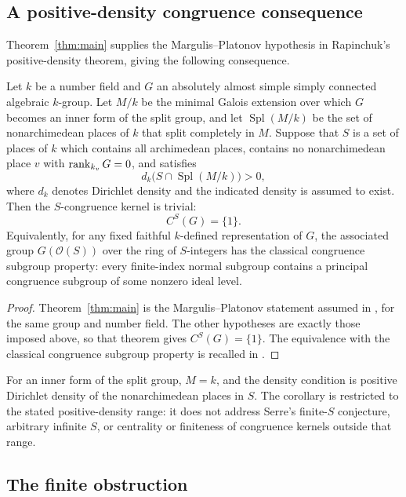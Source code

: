 \subsection{A positive-density congruence consequence}

Theorem~\ref{thm:main} supplies the Margulis--Platonov hypothesis in
Rapinchuk's positive-density theorem, giving the following consequence.

\begin{corollary}
\label{cor:positive-density-csp}
Let $k$ be a number field and $G$ an absolutely almost simple simply
connected algebraic $k$-group. Let $M/k$ be the minimal Galois extension
over which $G$ becomes an inner form of the split group, and let
$\operatorname{Spl}(M/k)$ be the set of nonarchimedean places of $k$ that
split completely in $M$. Suppose that $S$ is a set of places of $k$ which
contains all archimedean places, contains no nonarchimedean place $v$
with $\operatorname{rank}_{k_v}G=0$, and satisfies
\[
 d_k\bigl(S\cap\operatorname{Spl}(M/k)\bigr)>0,
\]
where $d_k$ denotes Dirichlet density and the indicated density is assumed
to exist. Then the $S$-congruence kernel is trivial:
\[
 C^S(G)=\{1\}.
\]
Equivalently, for any fixed faithful $k$-defined representation of $G$,
the associated group $G(\mathcal O(S))$ over the ring of $S$-integers
has the classical congruence subgroup property: every finite-index normal
subgroup contains a principal congruence subgroup of some nonzero ideal
level.
\end{corollary}

\begin{proof}
Theorem~\ref{thm:main} is the Margulis--Platonov statement assumed in
\cite[Theorem~1.1]{Rapinchuk2026}, for the same group and number field.
The other hypotheses are exactly those imposed above, so that theorem
gives $C^S(G)=\{1\}$. The equivalence with the classical congruence
subgroup property is recalled in \cite[Section~2]{Rapinchuk2026}.
\end{proof}

For an inner form of the split group, $M=k$, and the density condition is
positive Dirichlet density of the nonarchimedean places in $S$. The
corollary is restricted to the stated positive-density range: it does not
address Serre's finite-$S$ conjecture, arbitrary infinite $S$, or
centrality or finiteness of congruence kernels outside that range.

\subsection{The finite obstruction}

